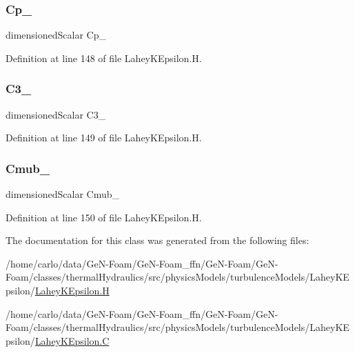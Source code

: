 \subsubsection{\texorpdfstring{Cp\+\_\+}{Cp\_}}
{\footnotesize\ttfamily dimensioned\+Scalar Cp\+\_\+\hspace{0.3cm}{\ttfamily [protected]}}



Definition at line 148 of file Lahey\+K\+Epsilon.\+H.

\mbox{\label{classFoam_1_1RASModels_1_1LaheyKEpsilon_aed8039605824e63ab9ac285e15c70bb7}} 
\subsubsection{\texorpdfstring{C3\+\_\+}{C3\_}}
{\footnotesize\ttfamily dimensioned\+Scalar C3\+\_\+\hspace{0.3cm}{\ttfamily [protected]}}



Definition at line 149 of file Lahey\+K\+Epsilon.\+H.

\mbox{\label{classFoam_1_1RASModels_1_1LaheyKEpsilon_a66f9d5abafee7f0bd61babed106fc733}} 
\subsubsection{\texorpdfstring{Cmub\+\_\+}{Cmub\_}}
{\footnotesize\ttfamily dimensioned\+Scalar Cmub\+\_\+\hspace{0.3cm}{\ttfamily [protected]}}



Definition at line 150 of file Lahey\+K\+Epsilon.\+H.



The documentation for this class was generated from the following files\+:\begin{DoxyCompactItemize}
\item 
/home/carlo/data/\+Ge\+N-\/\+Foam/\+Ge\+N-\/\+Foam\+\_\+ffn/\+Ge\+N-\/\+Foam/\+Ge\+N-\/\+Foam/classes/thermal\+Hydraulics/src/physics\+Models/turbulence\+Models/\+Lahey\+K\+Epsilon/\hyperlink{LaheyKEpsilon_8H}{Lahey\+K\+Epsilon.\+H}\item 
/home/carlo/data/\+Ge\+N-\/\+Foam/\+Ge\+N-\/\+Foam\+\_\+ffn/\+Ge\+N-\/\+Foam/\+Ge\+N-\/\+Foam/classes/thermal\+Hydraulics/src/physics\+Models/turbulence\+Models/\+Lahey\+K\+Epsilon/\hyperlink{LaheyKEpsilon_8C}{Lahey\+K\+Epsilon.\+C}\end{DoxyCompactItemize}
